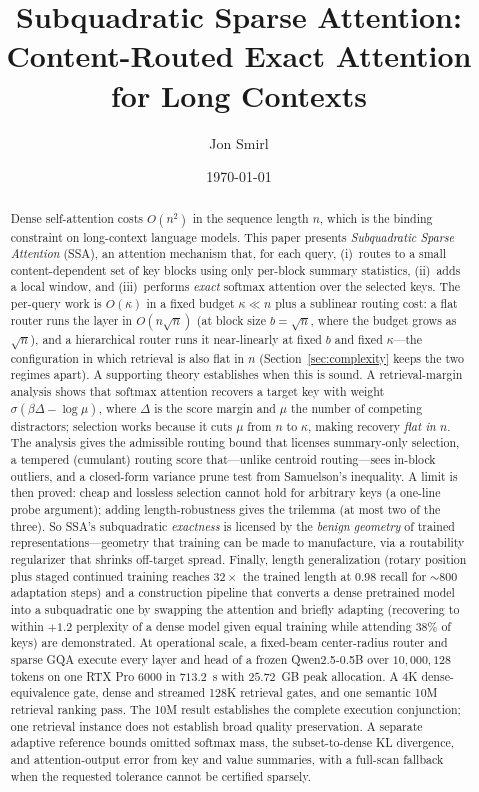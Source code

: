 \documentclass[11pt]{article}
\title{\textbf{Subquadratic Sparse Attention:\\ Content-Routed Exact Attention for Long Contexts}}
\author{Jon Smirl}
\date{\today}
\numberwithin{equation}{section}
\begin{document}
\maketitle

\begin{abstract}
\noindent
Dense self-attention costs $O(n^2)$ in the sequence length $n$, which is the binding constraint on
long-context language models. This paper presents \emph{Subquadratic Sparse Attention} (SSA), an attention mechanism
that, for each query, (i)~routes to a small content-dependent set of key blocks using only per-block summary
statistics, (ii)~adds a local window, and (iii)~performs \emph{exact} softmax attention over the selected
keys. The per-query work is $O(\kappa)$ in a fixed budget $\kappa\ll n$ plus a sublinear routing cost: a flat
router runs the layer in $O(n\sqrt{n})$ (at block size $b=\sqrt n$, where the budget grows as $\sqrt n$), and
a hierarchical router runs it near-linearly at fixed $b$ and fixed $\kappa$---the configuration in which
retrieval is also flat in $n$ (Section~\ref{sec:complexity} keeps the two regimes apart). A supporting theory establishes
when this is sound. A retrieval-margin analysis shows that softmax attention recovers a target key with weight
$\sigma(\beta\Delta-\log\mu)$, where $\Delta$ is the score margin and $\mu$ the number of competing
distractors; selection works because it cuts $\mu$ from $n$ to $\kappa$, making recovery \emph{flat in $n$}.
The analysis gives the admissible routing bound that licenses summary-only selection, a tempered (cumulant) routing score
that---unlike centroid routing---sees in-block outliers, and a closed-form variance prune test from
Samuelson's inequality. A limit is then proved: cheap and lossless selection cannot hold for arbitrary keys
(a one-line probe argument); adding length-robustness gives the trilemma (at most two of the three). So SSA's subquadratic \emph{exactness} is
licensed by the \emph{benign geometry} of trained representations---geometry that training can be made to
manufacture, via a routability regularizer that shrinks off-target spread. Finally, length
generalization (rotary position plus staged continued training reaches $32\times$ the trained length at $0.98$
recall for ${\sim}800$ adaptation steps) and a construction pipeline that converts a dense pretrained model
into a subquadratic one by swapping the attention and briefly adapting (recovering to within $+1.2$ perplexity
of a dense model given equal training while attending $38\%$ of keys) are demonstrated. At operational scale,
a fixed-beam center-radius router and sparse GQA execute every layer and head of a frozen Qwen2.5-0.5B over
$10{,}000{,}128$ tokens on one RTX Pro 6000 in $713.2$~s with $25.72$~GB peak allocation. A 4K
dense-equivalence gate, dense and streamed 128K retrieval gates, and one semantic 10M retrieval ranking pass.
The 10M result establishes the complete execution conjunction; one retrieval instance does not establish
broad quality preservation. A separate adaptive reference bounds omitted softmax mass, the
subset-to-dense KL divergence, and attention-output error from key and value summaries, with a full-scan
fallback when the requested tolerance cannot be certified sparsely.
\end{abstract}
\end{document}
